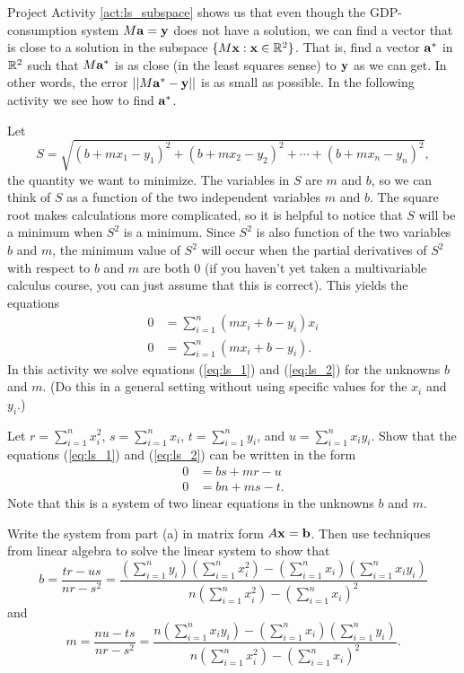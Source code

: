 Project Activity \ref{act:ls_subspace} shows us that even though the GDP-consumption system $M \mathbf{a} = \mathbf{y}$ does not have a solution, we can find a vector that is close to a solution in the subspace $\{M \mathbf{x} : \mathbf{x} \in \mathbb{R}^2\}$. That is, find a vector $\mathbf{a}^*$ in $\mathbb{R}^{2}$ such that $M \mathbf{a}^*$ is as close (in the least squares sense) to $\mathbf{y}$ as we can get. In other words, the error $||M \mathbf{a}^* - \mathbf{y}||$ is as small as possible. In the following activity we see how to find $\mathbf{a}^*$. 

\begin{pactivity} \label{act:ls_minimum} Let 
\[S = \sqrt{(b+mx_1-y_1)^2 + (b+mx_2-y_2)^2 + \cdots + (b+mx_n-y_n)^2},\]
the quantity we want to minimize. The variables in $S$ are $m$ and $b$, so we can think of $S$ as a function of the two independent variables $m$ and $b$. The square root makes calculations more complicated, so it is helpful to notice that $S$ will be a minimum when $S^2$ is a minimum. Since $S^2$ is also function of the two variables $b$ and $m$, the minimum value of $S^2$ will occur when the partial derivatives of $S^2$ with respect to $b$ and $m$ are both $0$ (if you haven't yet taken a multivariable calculus course, you can just assume that this is correct). This yields the equations 
\begin{align}
0 &= \sum_{i=1}^n \left( mx_i + b - y_i\right)x_i  \label{eq:ls_1} \\
0 &= \sum_{i=1}^n \left( mx_i+b-y_i\right). \label{eq:ls_2}
\end{align}
In this activity we solve equations (\ref{eq:ls_1}) and (\ref{eq:ls_2}) for the unknowns $b$ and $m$. (Do this in a general setting without using specific values for the $x_i$ and $y_i$.)
	\ba
	\item Let $r=\sum_{i=1}^n x_i^2$, $s=\sum_{i=1}^n x_i$, $t = \sum_{i=1}^n y_i$, and $u = \sum_{i=1}^n x_iy_i$. Show that the equations (\ref{eq:ls_1}) and (\ref{eq:ls_2}) can be written in the form 
\begin{align*}
0 &= bs + mr -u \\ %
0 &= bn + ms - t. %
\end{align*}	
Note that this is a system of two linear equations in the unknowns $b$ and $m$.

	\item Write the system from part (a) in matrix form $A \mathbf{x} = \mathbf{b}$. Then use techniques from linear algebra to solve the linear system to show that 
\begin{equation} \label{eq:ls_b} 
b = \frac{tr-us}{nr-s^2} = \frac{\left(\sum_{i=1}^n y_i\right) \left(\sum_{i=1}^n x_i^2\right) - \left(\sum_{i=1}^n x_i \right) \left(\sum_{i=1}^n x_iy_i \right)}{n\left(\sum_{i=1}^n x_i^2 \right) - \left(\sum_{i=1}^n x_i \right)^2}
\end{equation}
and
\begin{equation} \label{eq:ls_m} 
m = \frac{nu-ts}{nr-s^2} =  \frac{n\left(\sum_{i=1}^n x_iy_i\right) - \left(\sum_{i=1}^n x_i \right) \left(\sum_{i=1}^n y_i \right)}{n\left(\sum_{i=1}^n x_i^2 \right) - \left(\sum_{i=1}^n x_i \right)^2}.
\end{equation}



\end{pactivity}

